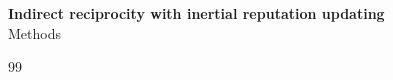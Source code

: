 \documentclass[fleqn,10pt]{article}
\begin{document}
\raggedbottom
\begin{center}
{\large\sffamily\bfseries Indirect reciprocity with inertial reputation updating}\\[0.3em]
{\sffamily Methods}
\end{center}

\begin{thebibliography}{99}

\end{thebibliography}
\end{document}
